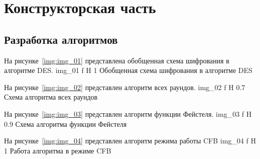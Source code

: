 \chapter{Конструкторская часть}

\section{Разработка алгоритмов}

На рисунке~\ref{img:img_01} представлена обобщенная схема шифрования в алгоритме DES. 
	{img_01}
	{f}
	{H}
	{1\textwidth}
	{Обобщенная схема шифрования в алгоритме DES}

\newpage

На рисунке~\ref{img:img_02} представлен алгоритм всех раундов. 
	{img_02}
	{f}
	{H}
	{0.7\textwidth}
	{Схема алгоритма всех раундов}
	
\newpage

На рисунке~\ref{img:img_03} представлен алгоритм функции Фейстеля. 
	{img_03}
	{f}
	{H}
	{0.9\textwidth}
	{Схема алгоритма функции Фейстеля}

\newpage

На рисунке~\ref{img:img_04} представлен алгоритм режима работы CFB 
	{img_04}
	{f}
	{H}
	{1\textwidth}
	{Работа алгоритма в режиме CFB}



